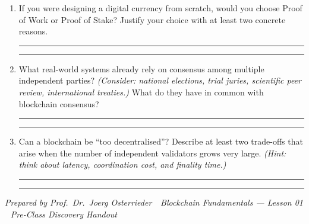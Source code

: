 \documentclass[11pt,a4paper]{article}
\begin{document}
\begin{enumerate}[leftmargin=1.8em, label=\textbf{\color{mlpurple}\arabic*.}]
  \item If you were designing a digital currency from scratch, would you choose Proof of Work or Proof of Stake? Justify your choice with at least two concrete reasons.

  \vspace{8pt}\noindent\rule{\linewidth}{0.3pt}\vspace{2pt}\noindent\rule{\linewidth}{0.3pt}
  \vspace{4pt}

  \item What real-world systems already rely on consensus among multiple independent parties?
  \textit{(Consider: national elections, trial juries, scientific peer review, international treaties.)}
  What do they have in common with blockchain consensus?

  \vspace{8pt}\noindent\rule{\linewidth}{0.3pt}\vspace{2pt}\noindent\rule{\linewidth}{0.3pt}
  \vspace{4pt}

  \item Can a blockchain be ``too decentralised''? Describe at least two trade-offs that arise when the number of independent validators grows very large.
  \textit{(Hint: think about latency, coordination cost, and finality time.)}

  \vspace{8pt}\noindent\rule{\linewidth}{0.3pt}\vspace{2pt}\noindent\rule{\linewidth}{0.3pt}
\end{enumerate}

\vspace{6pt}
\noindent\textcolor{mlgray}{\small\textit{Prepared by Prof.\ Dr.\ Joerg Osterrieder \,\textbullet\, Blockchain Fundamentals — Lesson 01 \,\textbullet\, Pre-Class Discovery Handout}}
\end{document}
